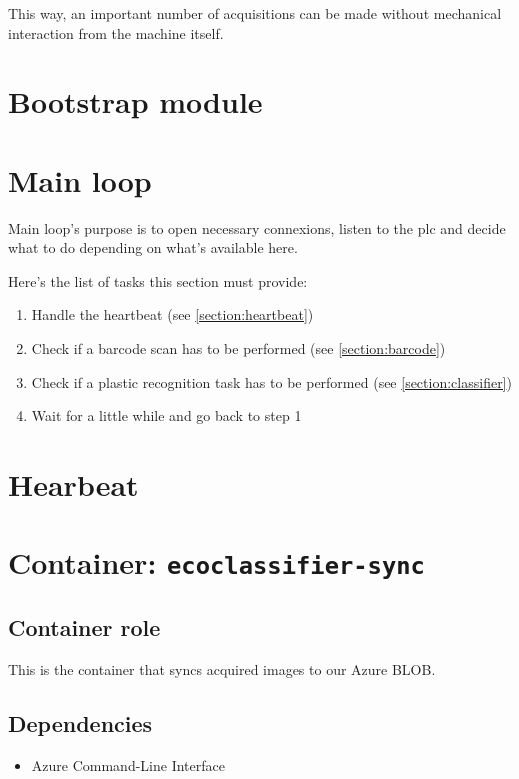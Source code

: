 This way, an important number of acquisitions can be made without mechanical interaction from the machine itself.

\section{Bootstrap module}


\section{Main loop}

Main loop's purpose is to open necessary connexions, listen to the \gls{plc} and decide what to do depending on what's available here.

Here's the list of tasks this section must provide:

\begin{enumerate}
    \item Handle the \gls{heartbeat} (see \ref{section:heartbeat})
    \item Check if a barcode scan has to be performed (see \ref{section:barcode})
    \item Check if a plastic recognition task has to be performed (see \ref{section:classifier})
    \item Wait for a little while and go back to step 1
\end{enumerate}

\section{Hearbeat}


\section{Container: \texttt{ecoclassifier-sync}}

\subsection{Container role}

This is the container that syncs acquired images to our Azure BLOB.

\subsection{Dependencies}

\begin{itemize}
    \item Azure Command-Line Interface
\end{itemize}
